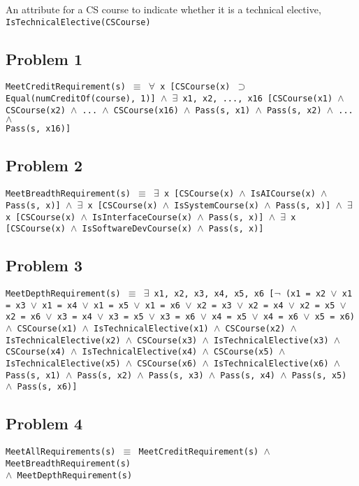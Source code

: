 \documentclass[11pt]{article}
\begin{document}
An attribute for a CS course to indicate whether it is a technical elective, \texttt{IsTechnicalElective(CSCourse)}

\subsection{Problem 1}
\texttt{MeetCreditRequirement(s) $\equiv$ $\forall$ x [CSCourse(x) $\supset$ Equal(numCreditOf(course), 1)] $\land$ $\exists$ x1, x2, ..., x16 [CSCourse(x1) $\land$ CSCourse(x2) $\land$ ... $\land$ CSCourse(x16) $\land$ Pass(s, x1) $\land$ Pass(s, x2) $\land$ ... $\land$} \\ \texttt{Pass(s, x16)]}

\subsection{Problem 2}
\texttt{MeetBreadthRequirement(s) $\equiv$ $\exists$ x [CSCourse(x) $\land$ IsAICourse(x) $\land$ Pass(s, x)] $\land$ $\exists$ x [CSCourse(x) $\land$ IsSystemCourse(x) $\land$ Pass(s, x)] $\land$ $\exists$ x [CSCourse(x) $\land$ IsInterfaceCourse(x) $\land$ Pass(s, x)] $\land$ $\exists$ x [CSCourse(x) $\land$ IsSoftwareDevCourse(x) $\land$ Pass(s, x)]}

\subsection{Problem 3}

\texttt{MeetDepthRequirement(s) $\equiv$ $\exists$ x1, x2, x3, x4, x5, x6 [$\neg$ (x1 = x2 $\lor$ x1 = x3 $\lor$ x1 = x4 $\lor$ x1 = x5 $\lor$ x1 = x6 $\lor$ x2 = x3 $\lor$ x2 = x4 $\lor$ x2 = x5 $\lor$ x2 = x6 $\lor$ x3 = x4 $\lor$ x3 = x5 $\lor$ x3 = x6 $\lor$ x4 = x5 $\lor$ x4 = x6 $\lor$ x5 = x6) $\land$ CSCourse(x1) $\land$ IsTechnicalElective(x1) $\land$ CSCourse(x2) $\land$ IsTechnicalElective(x2) $\land$ CSCourse(x3) $\land$ IsTechnicalElective(x3) $\land$ CSCourse(x4) $\land$ IsTechnicalElective(x4) $\land$ CSCourse(x5) $\land$ IsTechnicalElective(x5) $\land$ CSCourse(x6) $\land$ IsTechnicalElective(x6) $\land$ Pass(s, x1) $\land$ Pass(s, x2) $\land$ Pass(s, x3) $\land$ Pass(s, x4) $\land$ Pass(s, x5) $\land$ Pass(s, x6)]}



\subsection{Problem 4}
\texttt{MeetAllRequirements(s) $\equiv$ MeetCreditRequirement(s) $\land$ MeetBreadthRequirement(s)} \\\texttt{$\land$ MeetDepthRequirement(s)}
\end{document}
